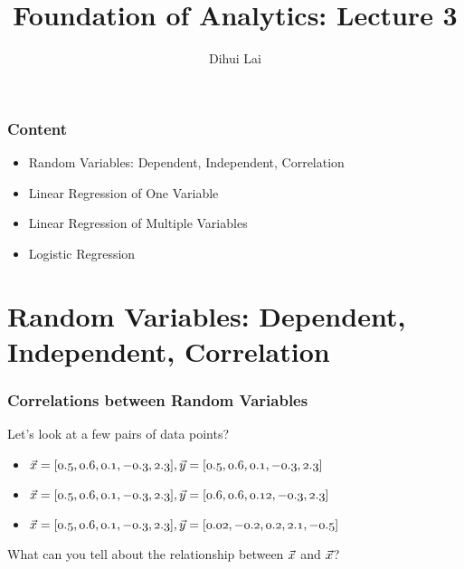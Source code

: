 \documentclass[notheorems, aspectratio=54]{beamer}
\title{Foundation of Analytics: Lecture 3}
\author{Dihui Lai}
\institute[WUSTL]{dlai@wustl.edu}
\begin{document}
\begin{frame}
    \titlepage
\end{frame}


\begin{frame}
\frametitle{Content}

\begin{itemize}
\item Random Variables: Dependent, Independent, Correlation 
\item Linear Regression of One Variable
\item Linear Regression of Multiple Variables
\item Logistic Regression
\end{itemize}
\end{frame}


\section{Random Variables: Dependent, Independent, Correlation }

\begin{frame}

\frametitle{Correlations between Random Variables}

Let's look at a few pairs of data  points?

\begin{itemize}
\item $\mathnormal{\vec{x}=[0.5, 0.6, 0.1, -0.3, 2.3], \vec{y}=[0.5, 0.6, 0.1, -0.3, 2.3]}$
\item $\mathnormal{\vec{x}=[0.5, 0.6, 0.1, -0.3, 2.3], \vec{y}=[0.6, 0.6, 0.12, -0.3, 2.3]}$
\item $\mathnormal{\vec{x}=[0.5, 0.6, 0.1, -0.3, 2.3], \vec{y}=[0.02, -0.2,0.2,2.1, -0.5]}$
\end{itemize}

What can you tell about the relationship between $\mathnormal{\vec{x}}$ and $\mathnormal{\vec{x}}$?

\end{frame}
\end{document}
